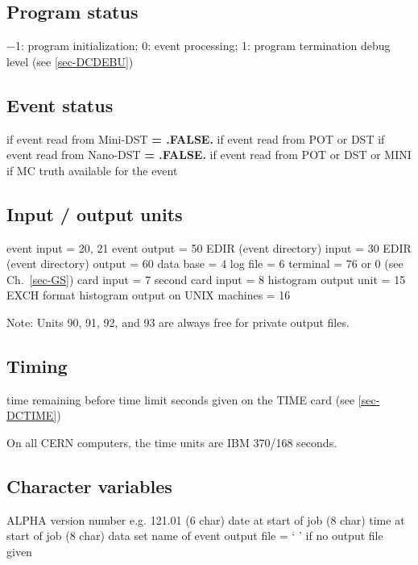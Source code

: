\subsection{\label{sec-MCS}Program status}
\par
\begin{indentlist}{ 2.50cm}{ 2.75cm}
$-$1: program initialization;
0: event processing;
1: program termination
debug level (see \ref{sec-DCDEBU})
\end{indentlist}
\subsection{\label{sec-MCE}Event status}
\par
\begin{indentlist}{ 2.50cm}{ 2.75cm}
 if event read from Mini-DST
{\bf = .FALSE.} if event read from POT or DST
 if event read from Nano-DST
{\bf = .FALSE.} if event read from POT or DST or MINI
 if MC truth available for the event
\end{indentlist}
\subsection{\label{sec-MCU}Input / output units}
\par
\begin{indentlist}{ 2.50cm}{ 2.75cm}
event input = 20, 21
event output = 50
EDIR (event directory) input = 30
EDIR (event directory) output = 60
data base = 4
log file = 6
terminal = 76 or 0 (see Ch.~\ref{sec-GS})
card input =  7
second card input = 8
histogram output unit = 15
EXCH format histogram output on UNIX machines = 16
\end{indentlist}
Note: Units 90, 91, 92, and 93 are always free for
private output files.
\subsection{\label{sec-MCT}Timing}
\par
\begin{indentlist}{ 2.50cm}{ 2.75cm}
time remaining before time limit
seconds given on the TIME card (see \ref{sec-DCTIME})
\end{indentlist}
On all CERN computers, the time units are
IBM 370/168 seconds.
\subsection{\label{sec-MCC}Character variables}
\par
\begin{indentlist}{ 2.50cm}{ 2.75cm}
ALPHA version number e.g. 121.01 (6 char)
date at start of job (8 char)
time at start of job (8 char)
data set name of event output file
= ` ' if no output file given
\end{indentlist}
